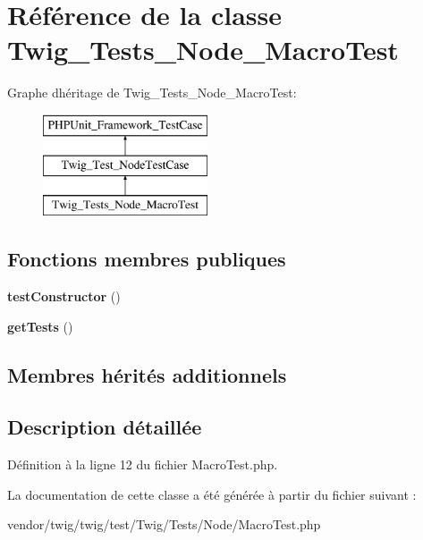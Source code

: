 \hypertarget{class_twig___tests___node___macro_test}{}\section{Référence de la classe Twig\+\_\+\+Tests\+\_\+\+Node\+\_\+\+Macro\+Test}
\label{class_twig___tests___node___macro_test}
Graphe d\textquotesingle{}héritage de Twig\+\_\+\+Tests\+\_\+\+Node\+\_\+\+Macro\+Test\+:\begin{figure}[H]
\begin{center}
\leavevmode
\includegraphics[height=3.000000cm]{class_twig___tests___node___macro_test}
\end{center}
\end{figure}
\subsection*{Fonctions membres publiques}
\begin{DoxyCompactItemize}
\item 
{\bfseries test\+Constructor} ()\hypertarget{class_twig___tests___node___macro_test_a47094dc941e72950570900d1418f89c6}{}\label{class_twig___tests___node___macro_test_a47094dc941e72950570900d1418f89c6}

\item 
{\bfseries get\+Tests} ()\hypertarget{class_twig___tests___node___macro_test_a7e247dd31cc8d37a6c97353a062a0080}{}\label{class_twig___tests___node___macro_test_a7e247dd31cc8d37a6c97353a062a0080}

\end{DoxyCompactItemize}
\subsection*{Membres hérités additionnels}


\subsection{Description détaillée}


Définition à la ligne 12 du fichier Macro\+Test.\+php.



La documentation de cette classe a été générée à partir du fichier suivant \+:\begin{DoxyCompactItemize}
\item 
vendor/twig/twig/test/\+Twig/\+Tests/\+Node/Macro\+Test.\+php\end{DoxyCompactItemize}

